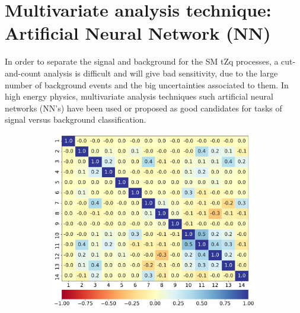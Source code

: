 \section{Multivariate analysis technique: Artificial Neural Network (NN)}
\label{sec:NN}
In order to separate the signal and background for the SM tZq processes, a cut-and-count analysis is difficult and will give bad sensitivity, due to the large number of background events and the big uncertainties associated to them. In high energy physics,  multivariate analysis techniques such artificial neural networks (NN's) have been used or proposed as good candidates for tasks of signal versus background classification.

\begin{figure}[h!] 
  \begin{subfigure}[b]{0.49\linewidth}
    \centering
    \includegraphics[width=\textwidth]{ubonn-thesis/Chapters/Chapters_06/Figure/Neural Network/SR_2j1b_correlation.pdf}
    \caption{}
    \end{subfigure}%
  \begin{subfigure}[b]{0.5\linewidth}
    \centering

\end{subfigure}
\end{figure}
